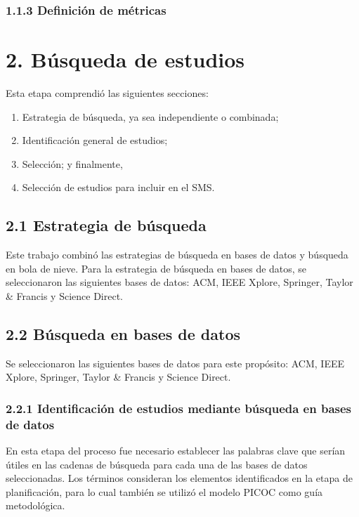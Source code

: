 \subsubsection*{1.1.3 Definición de métricas}
\label{subsubsec:metricasSMS}



\section*{2. Búsqueda de estudios}
\label{sec:busquedaEstudios}

Esta etapa comprendió las siguientes secciones: 
\begin{enumerate}
  \item Estrategia de búsqueda, ya sea independiente o combinada;
  \item Identificación general de estudios;
  \item Selección; y finalmente,
  \item Selección de estudios para incluir en el SMS.
\end{enumerate}

\subsection*{2.1 Estrategia de búsqueda}
\label{subsec:estrategiaBusqueda}

Este trabajo combinó las estrategias de búsqueda en bases de datos y búsqueda en bola de nieve. 
Para la estrategia de búsqueda en bases de datos, se seleccionaron las siguientes bases de datos: ACM, IEEE Xplore, Springer, Taylor \& Francis y Science Direct.

\subsection*{2.2 Búsqueda en bases de datos}
\label{subsec:busquedaBasesDatos}
Se seleccionaron las siguientes bases de datos para este propósito: ACM, IEEE Xplore, Springer, Taylor \& Francis y Science Direct.

\subsubsection*{2.2.1 Identificación de estudios mediante búsqueda en bases de datos}
\label{subsubsec:identificacionEstudios}
En esta etapa del proceso fue necesario establecer las palabras clave que serían útiles en las cadenas de búsqueda para cada una de las bases de datos seleccionadas. 
Los términos consideran los elementos identificados en la etapa de planificación, para lo cual también se utilizó el modelo PICOC como guía metodológica.

